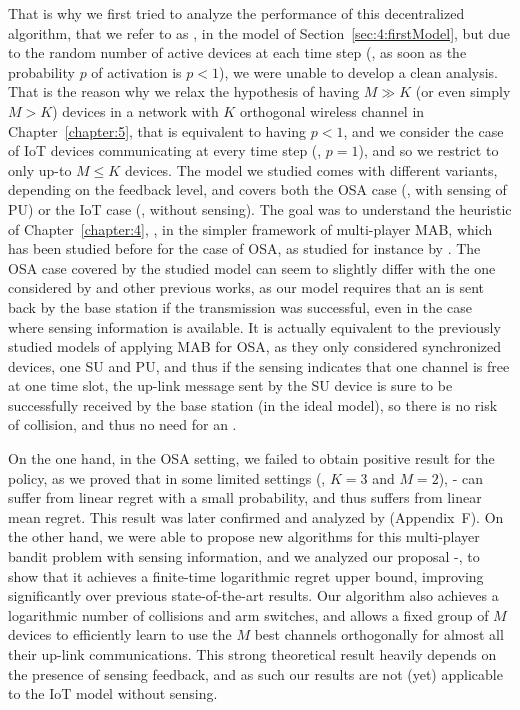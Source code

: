 That is why we first tried to analyze the performance of this decentralized algorithm, that we refer to as \Selfish, in the model of Section~\ref{sec:4:firstModel},
but due to the random number of active devices at each time step (\ie, as soon as the probability $p$ of activation is $p < 1$), we were unable to develop a clean analysis.
%
That is the reason why we relax the hypothesis of having $M \gg K$ (or even simply $M > K$) devices in a network with $K$ orthogonal wireless channel in Chapter~\ref{chapter:5}, that is equivalent to having $p < 1$, and we consider the case of IoT devices communicating at every time step (\ie, $p=1$), and so we restrict to only up-to $M \leq K$ devices.
The model we studied comes with different variants, depending on the feedback level, and covers both the OSA case (\ie, with sensing of PU) or the IoT case (\ie, without sensing).
The goal was to understand the heuristic of Chapter~\ref{chapter:4}, \Selfish, in the simpler framework of multi-player MAB, which has been studied before for the case of OSA, as studied for instance by \cite{Zhao10,Anandkumar10,Anandkumar11}.
%
The OSA case covered by the studied model can seem to slightly differ with the one considered by \cite{Jouini10} and other previous works,
as our model requires that an \Ack{} is sent back by the base station if the transmission was successful, even in the case where sensing information is available.
It is actually equivalent to the previously studied models of applying MAB for OSA, as they only considered synchronized devices, one SU and PU, and thus if the sensing indicates that one channel is free at one time slot, the up-link message sent by the SU device is sure to be successfully received by the base station (in the ideal model), so there is no risk of collision, and thus no need for an \Ack.


On the one hand, in the OSA setting, we failed to obtain positive result for the \Selfish{} policy, as we proved that in some limited settings (\eg, $K=3$ and $M=2$), \Selfish-\UCB{} can suffer from linear regret with a small probability, and thus suffers from linear mean regret.
This result was later confirmed and analyzed by \cite{BoursierPerchet18} (Appendix~F).
%
On the other hand, we were able to propose new algorithms for this multi-player bandit problem with sensing information, and we analyzed our proposal \MCTopM-\klUCB, to show that it achieves a finite-time logarithmic regret upper bound, improving significantly over previous state-of-the-art results.
Our algorithm also achieves a logarithmic number of collisions and arm switches, and allows a fixed group of $M$ devices to efficiently learn to use the $M$ best channels orthogonally for almost all their up-link communications.
%
This strong theoretical result heavily depends on the presence of sensing feedback, and as such our results are not (yet) applicable to the IoT model without sensing.

